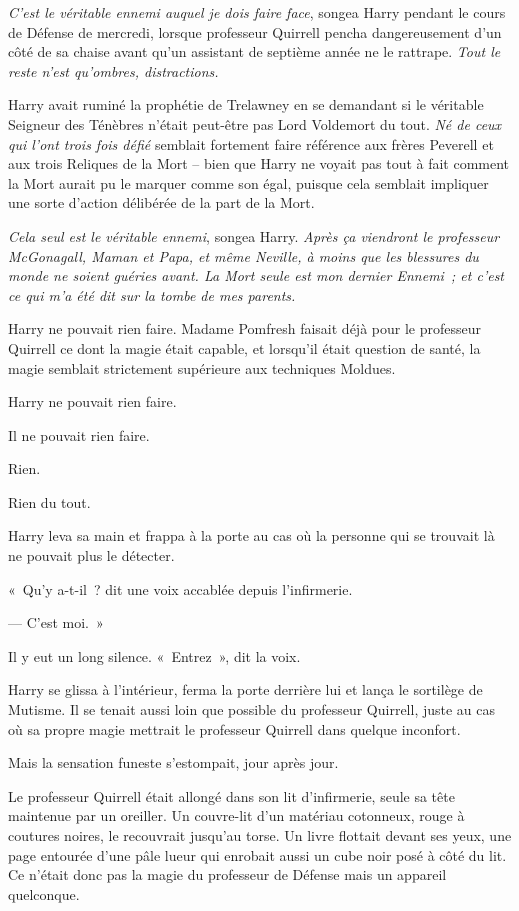 \emph{C'est le véritable ennemi auquel je dois faire face}, songea Harry pendant le cours de Défense de mercredi, lorsque professeur Quirrell pencha dangereusement d'un côté de sa chaise avant qu'un assistant de septième année ne le rattrape. \emph{Tout le reste n'est qu'ombres, distractions.}

Harry avait ruminé la prophétie de Trelawney en se demandant si le véritable Seigneur des Ténèbres n'était peut-être pas Lord Voldemort du tout. \emph{Né de ceux qui l'ont trois fois défié} semblait fortement faire référence aux frères Peverell et aux trois Reliques de la Mort -- bien que Harry ne voyait pas tout à fait comment la Mort aurait pu le marquer comme son égal, puisque cela semblait impliquer une sorte d'action délibérée de la part de la Mort.

\emph{Cela seul est le véritable ennemi}, songea Harry. \emph{Après ça viendront le professeur McGonagall, Maman et Papa, et même Neville, à moins que les blessures du monde ne soient guéries avant. La Mort seule est mon dernier Ennemi~; et c'est ce qui m'a été dit sur la tombe de mes parents.}

Harry ne pouvait rien faire. Madame Pomfresh faisait déjà pour le professeur Quirrell ce dont la magie était capable, et lorsqu'il était question de santé, la magie semblait strictement supérieure aux techniques Moldues.

Harry ne pouvait rien faire.

Il ne pouvait rien faire.

Rien.

Rien du tout.

\later

Harry leva sa main et frappa à la porte au cas où la personne qui se trouvait là ne pouvait plus le détecter.

«~Qu'y a-t-il~? dit une voix accablée depuis l'infirmerie.

--- C'est moi.~»

Il y eut un long silence. «~Entrez~», dit la voix.

Harry se glissa à l'intérieur, ferma la porte derrière lui et lança le sortilège de Mutisme. Il se tenait aussi loin que possible du professeur Quirrell, juste au cas où sa propre magie mettrait le professeur Quirrell dans quelque inconfort.

Mais la sensation funeste s'estompait, jour après jour.

Le professeur Quirrell était allongé dans son lit d'infirmerie, seule sa tête maintenue par un oreiller. Un couvre-lit d'un matériau cotonneux, rouge à coutures noires, le recouvrait jusqu'au torse. Un livre flottait devant ses yeux, une page entourée d'une pâle lueur qui enrobait aussi un cube noir posé à côté du lit. Ce n'était donc pas la magie du professeur de Défense mais un appareil quelconque.

